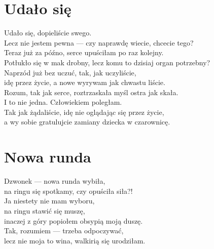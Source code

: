 \documentclass[12pt, a4paper]{memoir}
\begin{document}
\newpage
\section{Udało się}

\begin{flushleft}
Udało się, dopieliście swego.\\
Lecz nie jestem pewna — czy naprawdę wiecie, chcecie tego?\\[\baselineskip]

Teraz już za późno, serce upuściłam po raz kolejny.\\
Potłukło się w mak drobny, lecz komu to dzisiaj organ potrzebny?\\[\baselineskip]

Naprzód już bez uczuć, tak, jak uczyliście,\\
idę przez życie, a nowe wyrywam jak chwastu liście.\\[\baselineskip]

Rozum, tak jak serce, roztrzaskała myśl ostra jak skała.\\
I to nie jedna. Człowiekiem poległam.\\[\baselineskip]

Tak jak żądaliście, idę nie oglądając się przez życie,\\
a wy sobie gratulujcie zamiany dziecka w czarownicę.
\end{flushleft}

\newpage
\section{Nowa runda}

\begin{flushleft}
Dzwonek — nowa runda wybiła,\\
na ringu się spotkamy, czy opuściła siła?!\\[\baselineskip]

Ja niestety nie mam wyboru,\\
na ringu stawić się muszę,\\
inaczej z góry popiołem obsypią moją duszę.\\[\baselineskip]

Tak, rozumiem — trzeba odpoczywać,\\
lecz nie moja to wina, walkirią się urodziłam.
\end{flushleft}
\end{document}
